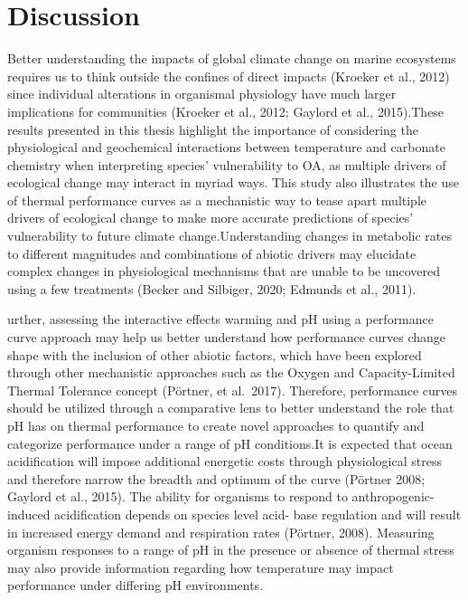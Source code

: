 \documentclass[
  12pt,
]{article}
\begin{document}
\newpage

\hypertarget{discussion}{%
\section{Discussion}\label{discussion}}

Better understanding the impacts of global climate change on marine
ecosystems requires us to think outside the confines of direct impacts
(Kroeker et al., 2012) since individual alterations in organismal
physiology have much larger implications for communities (Kroeker et
al., 2012; Gaylord et al., 2015).These results presented in this thesis
highlight the importance of considering the physiological and
geochemical interactions between temperature and carbonate chemistry
when interpreting species' vulnerability to OA, as multiple drivers of
ecological change may interact in myriad ways. This study also
illustrates the use of thermal performance curves as a mechanistic way
to tease apart multiple drivers of ecological change to make more
accurate predictions of species' vulnerability to future climate
change.Understanding changes in metabolic rates to different magnitudes
and combinations of abiotic drivers may elucidate complex changes in
physiological mechanisms that are unable to be uncovered using a few
treatments (Becker and Silbiger, 2020; Edmunds et al., 2011).

urther, assessing the interactive effects warming and pH using a
performance curve approach may help us better understand how performance
curves change shape with the inclusion of other abiotic factors, which
have been explored through other mechanistic approaches such as the
Oxygen and Capacity-Limited Thermal Tolerance concept (Pörtner, et
al.~2017). Therefore, performance curves should be utilized through a
comparative lens to better understand the role that pH has on thermal
performance to create novel approaches to quantify and categorize
performance under a range of pH conditions.It is expected that ocean
acidification will impose additional energetic costs through
physiological stress and therefore narrow the breadth and optimum of the
curve (Pörtner 2008; Gaylord et al., 2015). The ability for organisms to
respond to anthropogenic-induced acidification depends on species level
acid- base regulation and will result in increased energy demand and
respiration rates (Pörtner, 2008). Measuring organism responses to a
range of pH in the presence or absence of thermal stress may also
provide information regarding how temperature may impact performance
under differing pH environments.
\end{document}
